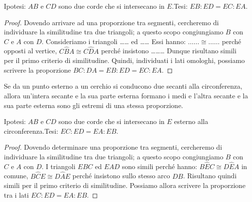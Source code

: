 \noindent Ipotesi: \(AB\) e \(CD\) sono due corde che si intersecano in 
\(E\).\tab Tesi: \(EB:ED=EC:EA\).

\noindent\begin{minipage}{0.65\textwidth}\parindent15pt
\begin{proof}
Dovendo arrivare ad una proporzione tra segmenti, cercheremo di 
individuare la similitudine tra due triangoli; a questo scopo 
congiungiamo \(B\) con \(C\) e \(A\) con \(D\). Consideriamo i triangoli 
\ldots\ldots{} ed \ldots\ldots{} Essi hanno: 
\(\ldots\ldots{}\cong\ldots\ldots{}\) perché opposti al vertice, 
\(C\widehat{B}A\cong C\widehat{D}A\) perché insistono 
\ldots\ldots\ldots{} Dunque risultano simili per il primo criterio di 
similitudine. Quindi, individuati i lati omologhi, possiamo scrivere 
la proporzione \(BC:DA=EB:ED=EC:EA\).
\end{proof}
\end{minipage}\hfil
\begin{minipage}{0.35\textwidth}
	\centering
\end{minipage}\vspace{5pt}

\begin{teorema}
Se da un punto esterno a un cerchio si conducono due secanti alla 
circonferenza, allora un'intera secante e la sua parte esterna 
formano i medi e l'altra secante e la sua parte esterna sono gli 
estremi di una stessa proporzione.
\end{teorema}

\noindent Ipotesi: \(AB\) e \(CD\) sono due corde che si intersecano in 
\(E\) esterno alla circonferenza.\tab Tesi: \(EC:ED=EA:EB\).

\noindent\begin{minipage}{0.65\textwidth}\parindent15pt
\begin{proof}
Dovendo determinare una proporzione tra segmenti, cercheremo di 
individuare la similitudine tra due triangoli; a questo scopo 
congiungiamo \(B\) con \(C\) e \(A\) con \(D\). I triangoli \(EBC\) ed \(EAD\) 
sono simili perché hanno: \(B\widehat{E}C\cong D\widehat{E}A\) in 
comune, \(B\widehat{C}E\cong D\widehat{A}E\) perché insistono sullo 
stesso arco \(DB\). Risultano quindi simili per il primo criterio di 
similitudine. Possiamo allora scrivere la proporzione tra i lati 
\(EC:ED=EA:EB\).
\end{proof}
\end{minipage}\hfil
\begin{minipage}{0.35\textwidth}
	\centering
\end{minipage}\vspace{5pt}

